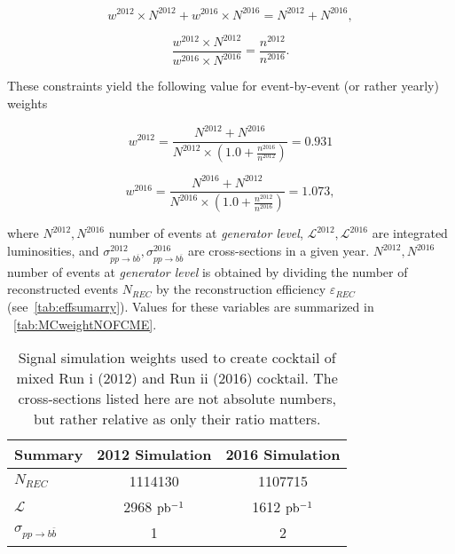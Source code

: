 \begin{equation}
w^{2012} \times N^{2012} + w^{2016} \times N^{2016} = N^{2012} + N^{2016},
\end{equation}

\begin{equation}
\frac{w^{2012} \times N^{2012}}{w^{2016} \times N^{2016}} = \frac{n^{2012}}{n^{2016}}.
\end{equation}

These constraints yield the following value for event-by-event (or rather yearly) weights


\begin{equation}
w^{2012}= \frac{N^{2012}+N^{2016}}{N^{2012}\times(1.0+\frac{n^{2016}}{n^{2012}})}=0.931
\end{equation}


\begin{equation}
w^{2016}= \frac{N^{2016}+N^{2012}}{N^{2016}\times(1.0+ \frac{n^{2012}}{n^{2016}})}=1.073,
\end{equation}



where $N^{2012},N^{2016}$ number of events at \textit{generator level}, $\mathcal{L}^{2012},\mathcal{L}^{2016}$ are integrated luminosities, and $\sigma^{2012}_{pp \rightarrow b \overline{b}}, \sigma^{2016}_{pp \rightarrow b \overline{b}}$ are cross-sections in a given year. $N^{2012},N^{2016}$ number of events at \textit{generator level} is obtained by dividing the number of reconstructed events $N_{REC}$ by the reconstruction efficiency $\varepsilon_{REC}$ (see~\autoref{tab:effsumarry}). Values for these variables are summarized in ~\autoref{tab:MCweightNOFCME}.


\begin{table}[h]
\centering
\begin{tabular}{ l  c  c }
\toprule
Summary & 2012 Simulation & 2016 Simulation \\
\midrule


$N_{REC}$  & 1114130 & 1107715 \\
$\mathcal{L}$ & 2968 $\rm{pb^{-1}}$ & 1612 $\rm{pb^{-1}}$ \\
$\sigma_{pp \rightarrow b \overline{b}}$ & 1 & 2  \\
\bottomrule
\end{tabular}
	\caption{Signal simulation weights used to create cocktail of mixed Run \Rn{1} (2012) and Run \Rn{2} (2016) cocktail. The cross-sections listed here are not absolute numbers, but rather relative as only their ratio matters.}
\label{tab:MCweightNOFCME}
\end{table}

